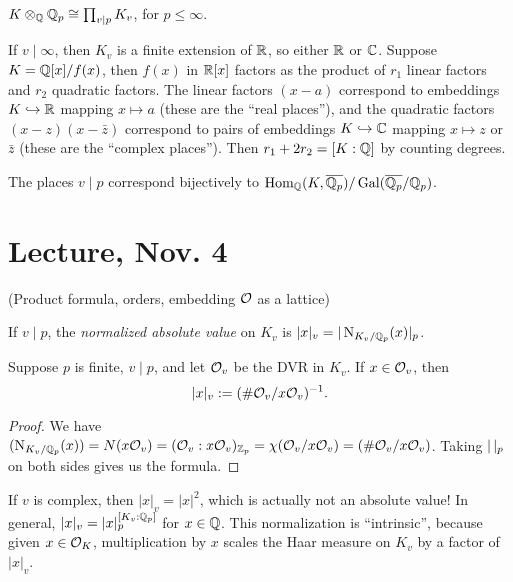 \documentclass[11pt]{amsart}
\begin{document}
\begin{thm}
$K\otimes_{\mathbb{Q}} \mathbb{Q}_p \cong \prod_{v\mid p} K_v$, for $p\le \infty$.
\end{thm}

\begin{exm}
If $v\mid\infty$, then $K_v$ is a finite extension of $\mathbb{R}$, so either $\mathbb{R}$ or $\mathbb{C}$. Suppose $K = \mathbb{Q}[x]/f(x)$, then $f(x)$ in $\mathbb{R}[x]$ factors as the product of $r_1$ linear factors and $r_2$ quadratic factors. The linear factors $(x-a)$ correspond to embeddings $K\hookrightarrow \mathbb{R}$ mapping $x\mapsto a$ (these are the ``real places''), and the quadratic factors $(x-z)(x-\bar{z})$ correspond to pairs of embeddings $K\hookrightarrow \mathbb{C}$ mapping $x\mapsto z$ or $\bar{z}$ (these are the ``complex places''). Then $r_1+2r_2 = [K:\mathbb{Q}]$ by counting degrees.
\end{exm}

\begin{cor}
The places $v\mid p$ correspond bijectively to $\operatorname{Hom}_{\mathbb{Q}}(K, \overline{\mathbb{Q}_p}) / \operatorname{Gal}(\overline{\mathbb{Q}_p}/\mathbb{Q}_p)$.
\end{cor}


\section{Lecture, Nov. 4}

(Product formula, orders, embedding $\mathcal{O}$ as a lattice)

\begin{defn}
If $v\mid p$, the \emph{normalized absolute value} on $K_v$ is $|x|_v = |\operatorname{N}_{K_v/\mathbb{Q}_p} (x)|_p$.
\end{defn}

\begin{prop}
Suppose $p$ is finite, $v\mid p$, and let $\mathcal{O}_v$ be the DVR in $K_v$. If $x\in \mathcal{O}_v$, then
\[|x|_v := (\# \mathcal{O}_v/x\mathcal{O}_v)^{-1}.\]
\end{prop}

\begin{proof}
We have $(\operatorname{N}_{K_v/\mathbb{Q}_p}(x)) = N(x\mathcal{O}_v) = (\mathcal{O}_v: x\mathcal{O}_v)_{\mathbb{Z}_p} = \chi(\mathcal{O}_v/x\mathcal{O}_v) = (\# \mathcal{O}_v/x\mathcal{O}_v)$. Taking $|\thinspace|_p$ on both sides gives us the formula.
\end{proof}

\begin{exm}
If $v$ is complex, then $|x|_v = |x|^2$, which is actually not an absolute value! In general, $|x|_v = |x|_p^{[K_v:\mathbb{Q}_p]}$ for $x\in \mathbb{Q}$. This normalization is ``intrinsic'', because given $x\in \mathcal{O}_K$, multiplication by $x$ scales the Haar measure on $K_v$ by a factor of $|x|_v$.
\end{exm}
\end{document}
